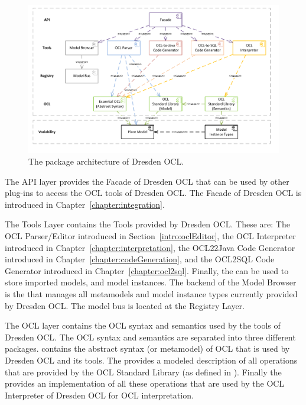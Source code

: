 \begin{figure}[!b]
	\centering
	\includegraphics[width=1.0\linewidth]{figures/architecture/modules}
	\caption{The package architecture of Dresden OCL.}
	\label{pic:architecture:modules}
\end{figure}

The API layer provides the Facade of Dresden OCL that can be used by other
plug-ins to access the \acs{OCL} tools of Dresden OCL. The Facade of Dresden OCL
is introduced in Chapter~\ref{chapter:integration}.

The Tools Layer contains the Tools provided by Dresden OCL. These are: The
\acs{OCL} Parser/Editor introduced in Section~\ref{intro:oclEditor}, the
\acs{OCL} Interpreter introduced in Chapter~\ref{chapter:interpretation}, the
\acs{OCL}22Java Code Generator introduced in
Chapter~\ref{chapter:codeGeneration}, and the
\acs{OCL}2SQL Code Generator introduced in
Chapter~\ref{chapter:ocl2sql}. Finally, the 
can be used to store imported models, and model instances. The backend of the Model
Browser is the  that manages all metamodels and model
instance types currently provided by Dresden OCL. The model bus is located at the
Registry Layer.

The \acs{OCL} layer contains the \acs{OCL} syntax and semantics used by the
tools of Dresden OCL. The \acs{OCL} syntax and semantics are separated into
three different packages.  contains the abstract syntax
(or metamodel) of \acs{OCL} that is used by Dresden OCL and its tools. The
 provides a modeled description of all
operations that are provided by the \acs{OCL} Standard Library (as defined in
\cite[Ch.~11]{spec:OCL2-3}). Finally the  provides an implementation of all these operations that are used by
the \acs{OCL} Interpreter of Dresden OCL for \acs{OCL} interpretation.

